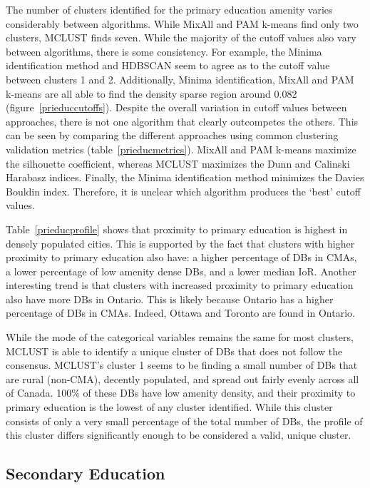 \documentclass[11pt, a4paper]{article}
\begin{document}
The number of clusters identified for the primary education amenity varies considerably between algorithms. While MixAll and PAM k-means find only two clusters, MCLUST finds seven. While the majority of the cutoff values also vary between algorithms, there is some consistency. For example, the Minima identification method and HDBSCAN seem to agree as to the cutoff value between clusters 1 and 2. Additionally, Minima identification, MixAll and PAM k-means are all able to find the density sparse region around 0.082 (figure~\ref{prieduccutoffs}). Despite the overall variation in cutoff values between approaches, there is not one algorithm that clearly outcompetes the others. This can be seen by comparing the different approaches using common clustering validation metrics (table~\ref{prieducmetrics}). MixAll and PAM k-means maximize the silhouette coefficient, whereas MCLUST maximizes the Dunn and Calinski Harabasz indices. Finally, the Minima identification method minimizes the Davies Bouldin index. Therefore, it is unclear which algorithm produces the `best’ cutoff values.
\par
Table~\ref{prieducprofile} shows that proximity to primary education is highest in densely populated cities. This is supported by the fact that clusters with higher proximity to primary education also have: a higher percentage of DBs in CMAs, a lower percentage of low amenity dense DBs, and a lower median IoR. Another interesting trend is that clusters with increased proximity to primary education also have more DBs in Ontario. This is likely because Ontario has a higher percentage of DBs in CMAs. Indeed, Ottawa and Toronto are found in Ontario.
\par
While the mode of the categorical variables remains the same for most clusters, MCLUST is able to identify a unique cluster of DBs that does not follow the consensus. MCLUST’s cluster 1 seems to be finding a small number of DBs that are rural (non-CMA), decently populated, and spread out fairly evenly across all of Canada. 100\% of these DBs have low amenity density, and their proximity to primary education is the lowest of any cluster identified. While this cluster consists of only a very small percentage of the total number of DBs, the profile of this cluster differs significantly enough to be considered a valid, unique cluster.








\pagebreak
\justifying
\subsection{Secondary Education}
\end{document}
